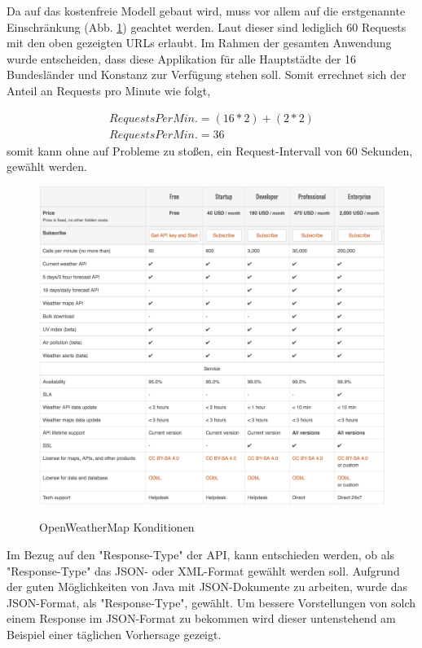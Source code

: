 Da auf das kostenfreie Modell gebaut wird, muss vor allem auf die erstgenannte Einschränkung (Abb. \ref{img:OpenWeather}) geachtet werden. Laut dieser sind lediglich 60 Requests mit den oben gezeigten URLs erlaubt. Im Rahmen der gesamten Anwendung wurde entscheiden, dass diese Applikation für alle Hauptstädte der 16 Bundesländer und Konstanz zur Verfügung stehen soll. Somit errechnet sich der Anteil an Requests pro Minute wie folgt,

\begin{align}
RequestsPerMin. = (16*2)+(2*2)\\
RequestsPerMin. = 36
\end{align}
somit kann ohne auf Probleme zu stoßen, ein Request-Intervall von 60 Sekunden, gewählt werden. 

\begin{figure}[!ht]
	\centering
	\includegraphics[width=1.0\textwidth]{Bilder/OpenWeatherMap.png}
	\caption{OpenWeatherMap Konditionen}\cite{map:1}
	\label{img:OpenWeather}
\end{figure} 
Im Bezug auf den "Response-Type" der API, kann entschieden werden, ob als "Response-Type" das JSON- oder XML-Format gewählt werden soll. Aufgrund der guten Möglichkeiten von Java mit JSON-Dokumente zu arbeiten, wurde  das JSON-Format, als "Response-Type", gewählt.
Um bessere Vorstellungen von solch einem Response im JSON-Format zu bekommen wird dieser untenstehend am Beispiel einer täglichen Vorhersage gezeigt.  

